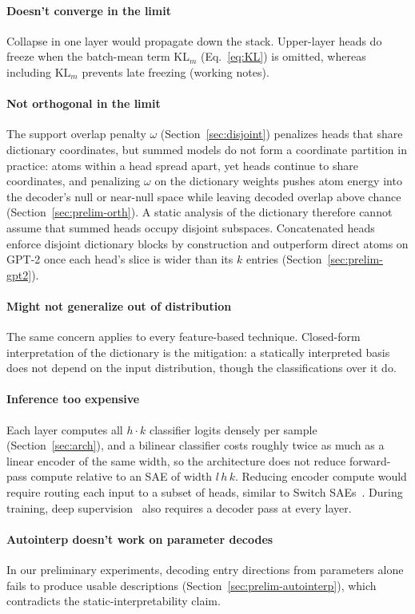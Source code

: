 \paragraph{Doesn't converge in the limit}
Collapse in one layer would propagate down the stack. Upper-layer heads
do freeze when the batch-mean term $\mathrm{KL}_m$ (Eq.~\eqref{eq:KL})
is omitted, whereas including $\mathrm{KL}_m$ prevents late freezing
(working notes).

\paragraph{Not orthogonal in the limit}
The support overlap penalty $\omega$ (Section~\ref{sec:disjoint})
penalizes heads that share dictionary coordinates, but summed models do
not form a coordinate partition in practice: atoms within a head spread
apart, yet heads continue to share coordinates, and penalizing $\omega$
on the dictionary weights pushes atom energy into the decoder's null or
near-null space while leaving decoded overlap above chance
(Section~\ref{sec:prelim-orth}). A static analysis of the dictionary
therefore cannot assume that summed heads occupy disjoint subspaces.
Concatenated heads enforce disjoint dictionary blocks by construction and
outperform direct atoms on GPT-2 once each head's slice is wider than
its $k$ entries (Section~\ref{sec:prelim-gpt2}).

\paragraph{Might not generalize out of distribution}
The same concern applies to every feature-based technique. Closed-form
interpretation of the dictionary is the mitigation: a statically
interpreted basis does not depend on the input distribution, though the
classifications over it do.

\paragraph{Inference too expensive}
Each layer computes all $h \cdot k$ classifier logits densely per sample
(Section~\ref{sec:arch}), and a bilinear classifier costs roughly twice
as much as a linear encoder of the same width, so the architecture does
not reduce forward-pass compute relative to an SAE of width $l\,h\,k$.
Reducing encoder compute would require routing each input to a subset of
heads, similar to Switch SAEs~\cite{mudide2025}. During training, deep
supervision~\cite{lee2015deeply} also requires a decoder pass at every
layer.

\paragraph{Autointerp doesn't work on parameter decodes}
In our preliminary experiments, decoding entry directions from parameters
alone fails to produce usable descriptions
(Section~\ref{sec:prelim-autointerp}), which contradicts the
static-interpretability claim.

